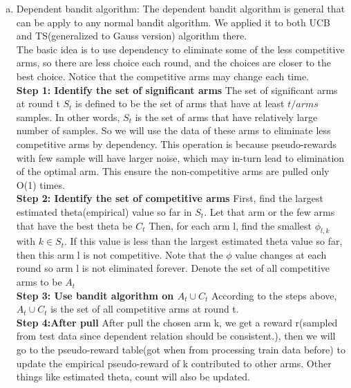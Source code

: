 \documentclass{article}
\begin{document}
\begin{homeworkProblem}
\begin{enumerate}
\begin{enumerate}[a.]
            
            \item Dependent bandit algorithm:
            The dependent bandit algorithm is general that can be apply to any normal bandit algorithm. We applied it to both UCB and TS(generalized to Gauss version) algorithm there.\\
            The basic idea is to use dependency to eliminate some of the less competitive arms, so there are less choice each round, and the choices are closer to the best choice. Notice that the competitive arms may change each time.\\
            \textbf{Step 1: Identify the set of significant arms} The set of significant arms at round t $S_t$ is defined to be the set of arms that have at least $t/arms$ samples.
            In other words, $S_t$ is the set of arms that have relatively large number of samples. So we will use the data of these arms to eliminate less competitive arms by dependency. This operation is because pseudo-rewards with few sample will have larger noise, which may in-turn lead to elimination of the optimal arm. This ensure the non-competitive arms are pulled only O(1) times. \\
            \textbf{Step 2: Identify the set of competitive arms} First, find the largest estimated theta(empirical) value so far in $S_t$. Let that arm or the few arms that have the best theta be $C_t$ Then, for each arm l, find the smallest $\phi_{l,k}$ with $k\in S_t$.
            If this value is less than the largest estimated theta value so far, then this arm l is not competitive. Note that the $\phi$ value changes at each round so arm l is not eliminated forever.
            Denote the set of all competitive arms to be $A_t$\\
            \textbf{Step 3: Use bandit algorithm on $A_t\cup C_t$} According to the steps above, $A_t\cup C_t$ is the set of all competitive arms at round t.\\
            \textbf{Step 4:After pull} After pull the chosen arm k, we get a reward r(sampled from test data since dependent relation should be consistent.), then we will go to the pseudo-reward table(got when from processing train data before) to update the empirical pseudo-reward of k contributed to other arms. Other things like estimated theta, count will also be updated.


\end{enumerate}
\end{enumerate}
\end{homeworkProblem}
\end{document}

